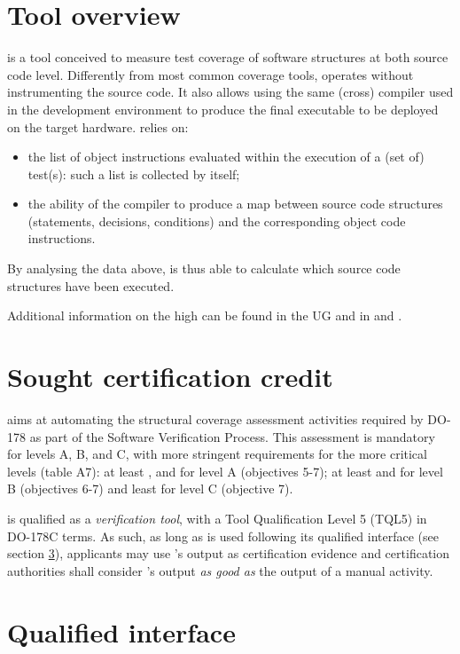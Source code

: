 \documentclass {report}
\begin{document}
\section{Tool overview}
\xcov{} is a tool conceived to measure test coverage of software structures at both source code level. Differently from most common coverage tools, \xcov{} operates without instrumenting the source code. It also allows using the same (cross) compiler used in the development environment to produce the final executable to be deployed on the target hardware. \xcov{} relies on:
\begin{itemize}
\item the list of object instructions evaluated within the execution of a (set of) test(s): such a list is collected by \xcov{} itself; 
\item the ability of the compiler to produce a map between source code structures (statements, decisions, conditions) and the corresponding object code instructions.
\end{itemize}
By analysing the data above, \xcov{} is thus able to calculate which source code structures have been executed.

Additional information on the high \xcov{} can be found in the \xcov{} UG and in \adaeurope and \erts.

\section {Sought certification credit}

\xcov{} aims at automating the structural coverage assessment activities 
required by DO-178 as part of the Software Verification Process.
%
This assessment is mandatory for levels A, B, and C, with more stringent
requirements for the more critical levels (table A7): at least \mcdc{}, \dc{}
and \stc{} for level A (objectives 5-7); at least \dc{} and \stc{} for level B
(objectives 6-7) and least \stc{} for level C (objective 7).

\xcov{} is qualified as a \emph{verification tool}, with a Tool Qualification
Level 5 (TQL5) in DO-178C terms.
%
As such, as long as \xcov{} is used following its qualified interface (see
section \ref{sec:qual-interface}), applicants may use \xcov{}'s output as
certification evidence and certification authorities shall consider \xcov{}'s
output \emph{as good as} the output of a manual activity.

\section{Qualified interface}
\label{sec:qual-interface}
\end{document}
